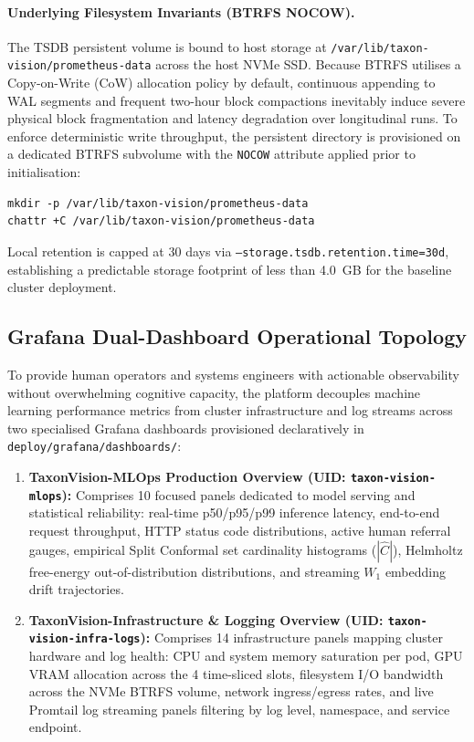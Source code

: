 \paragraph{Underlying Filesystem Invariants (BTRFS NOCOW).}
The TSDB persistent volume is bound to host storage at \nolinkurl{/var/lib/taxon-vision/prometheus-data} across the host NVMe SSD. Because BTRFS utilises a Copy-on-Write (CoW) allocation policy by default, continuous appending to WAL segments and frequent two-hour block compactions inevitably induce severe physical block fragmentation and latency degradation over longitudinal runs. To enforce deterministic write throughput, the persistent directory is provisioned on a dedicated BTRFS subvolume with the \texttt{NOCOW} attribute applied prior to initialisation:
\begin{verbatim}
mkdir -p /var/lib/taxon-vision/prometheus-data
chattr +C /var/lib/taxon-vision/prometheus-data
\end{verbatim}
Local retention is capped at 30 days via \texttt{--storage.tsdb.retention.time=30d}, establishing a predictable storage footprint of less than 4.0~GB for the baseline cluster deployment.

\subsection{Grafana Dual-Dashboard Operational Topology}
\label{sec:grafana_dual_dashboards}

To provide human operators and systems engineers with actionable observability without overwhelming cognitive capacity, the platform decouples machine learning performance metrics from cluster infrastructure and log streams across two specialised Grafana dashboards provisioned declaratively in \nolinkurl{deploy/grafana/dashboards/}:
\begin{enumerate}
    \item \textbf{TaxonVision-MLOps Production Overview (UID: \texttt{taxon-vision-mlops}):} Comprises 10 focused panels dedicated to model serving and statistical reliability: real-time p50/p95/p99 inference latency, end-to-end request throughput, HTTP status code distributions, active human referral gauges, empirical Split Conformal set cardinality histograms ($|\hat{C}|$), Helmholtz free-energy out-of-distribution distributions, and streaming $W_1$ embedding drift trajectories.
    \item \textbf{TaxonVision-Infrastructure \& Logging Overview (UID: \texttt{taxon-vision-infra-logs}):} Comprises 14 infrastructure panels mapping cluster hardware and log health: CPU and system memory saturation per pod, GPU VRAM allocation across the 4 time-sliced slots, filesystem I/O bandwidth across the NVMe BTRFS volume, network ingress/egress rates, and live Promtail log streaming panels filtering by log level, namespace, and service endpoint.
\end{enumerate}

